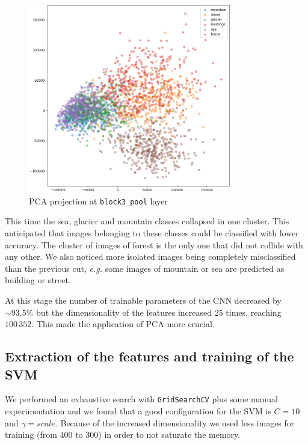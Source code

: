 \documentclass[compsoc]{IEEEtran}
\begin{document}
\begin{figure}[ht!]
\centering                                                                        
\includegraphics[width=3.5in]{../images/pca-3.png}
\captionsetup{justification=centering}                                                                                         
\caption{PCA projection at \texttt{block3\_pool} layer}
\label{fig:pca3}                                                                                                                               
\end{figure}

This time the sea, glacier and mountain classes collapsed in one cluster. This anticipated that images belonging to these classes could be classified with lower accuracy.
The cluster of images of forest is the only one that did not collide with any other.
We also noticed more isolated images being completely misclassified than the previous cut, \emph{e.g.} some images of mountain or sea are predicted as building or street.
\par



At this stage the number of trainable parameters of the CNN decreased by ${\sim93.5\%}$ but the dimensionality of the features increased 25 times, reaching $100\,352$. This made the application of PCA more crucial. 


\subsection{Extraction of the features and training of the SVM}
We performed an exhaustive search with \texttt{GridSearchCV} plus some manual experimentation and we found that a good configuration for the SVM is $C=10$ and $\gamma=scale$. Because of the increased dimensionality we used less images for training (from $400$ to $300$) in order to not saturate the memory. 	\par
\end{document}
